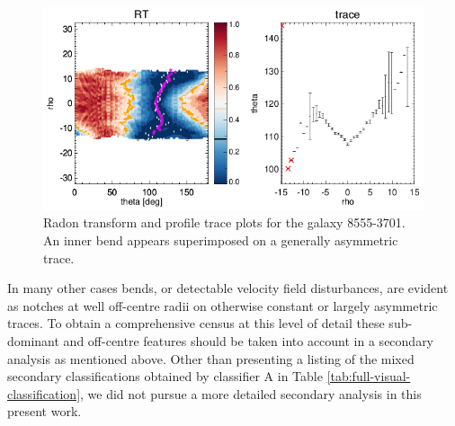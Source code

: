\begin{figure}
    \centering
    \includegraphics[width=\columnwidth]{images/RadonPlots/RT-SNIPS-NEW/8555-3701-A+IB.png}
    \caption[Radon transform and profile trace plots for the galaxy 8555-3701]{Radon transform and profile trace plots for the galaxy 8555-3701. An inner bend appears superimposed on a generally asymmetric trace.}
    \label{fig:8555-3701-A+IB}
\end{figure}

In many other cases bends, or detectable velocity field disturbances, are evident as notches at well off-centre radii on otherwise constant or largely asymmetric traces. To obtain a comprehensive census at this level of detail these sub-dominant and off-centre features should be taken into account in a secondary analysis as mentioned above. Other than presenting a listing of the mixed secondary classifications obtained by classifier A in Table \ref{tab:full-visual-classification}, we did not pursue a more detailed secondary analysis in this present work.




